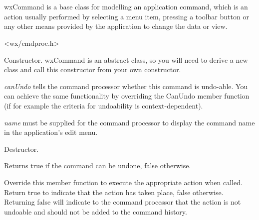 \section{}\label{wxcommand}

wxCommand is a base class for modelling an application command,
which is an action usually performed by selecting a menu item, pressing
a toolbar button or any other means provided by the application to
change the data or view.




<wx/cmdproc.h>




\label{wxcommandctor}


Constructor. wxCommand is an abstract class, so you will need to derive
a new class and call this constructor from your own constructor.

{\it canUndo} tells the command processor whether this command is undo-able. You
can achieve the same functionality by overriding the CanUndo member function (if for example
the criteria for undoability is context-dependent).

{\it name} must be supplied for the command processor to display the command name
in the application's edit menu.

\label{wxcommanddtor}


Destructor.

\label{wxcommandcanundo}


Returns true if the command can be undone, false otherwise.

\label{wxcommanddo}


Override this member function to execute the appropriate action when called.
Return true to indicate that the action has taken place, false otherwise.
Returning false will indicate to the command processor that the action is
not undoable and should not be added to the command history.

